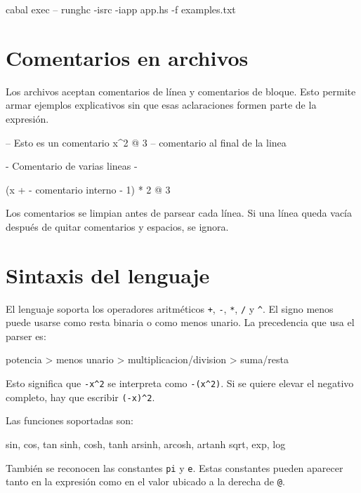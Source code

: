 \documentclass[11pt,a4paper]{article}
\newenvironment{codeblock}{\verbatim}{\endverbatim}
\begin{document}
\begin{codeblock}
cabal exec -- runghc -isrc -iapp app\Main.hs -f examples\basico.txt
\end{codeblock}

\section{Comentarios en archivos}

Los archivos aceptan comentarios de línea y comentarios de bloque. Esto permite armar ejemplos explicativos sin que esas aclaraciones formen parte de la expresión.

\begin{codeblock}
-- Esto es un comentario
x^2 @ 3 -- comentario al final de la linea
\end{codeblock}

\begin{codeblock}
{- Comentario
   de varias lineas -}

(x + {- comentario interno -} 1) * 2 @ 3
\end{codeblock}

Los comentarios se limpian antes de parsear cada línea. Si una línea queda vacía después de quitar comentarios y espacios, se ignora.

\section{Sintaxis del lenguaje}

El lenguaje soporta los operadores aritméticos \texttt{+}, \texttt{-}, \texttt{*}, \texttt{/} y \texttt{\^{}}. El signo menos puede usarse como resta binaria o como menos unario. La precedencia que usa el parser es:

\begin{codeblock}
potencia > menos unario > multiplicacion/division > suma/resta
\end{codeblock}

Esto significa que \texttt{-x\^{}2} se interpreta como \texttt{-(x\^{}2)}. Si se quiere elevar el negativo completo, hay que escribir \texttt{(-x)\^{}2}.

Las funciones soportadas son:

\begin{codeblock}
sin, cos, tan
sinh, cosh, tanh
arsinh, arcosh, artanh
sqrt, exp, log
\end{codeblock}

También se reconocen las constantes \texttt{pi} y \texttt{e}. Estas constantes pueden aparecer tanto en la expresión como en el valor ubicado a la derecha de \texttt{@}.
\end{document}
